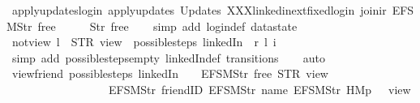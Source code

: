 \begin{isabellebody}
\ apply{\isacharunderscore}updates{\isacharunderscore}login{\isacharcolon}\ {\isachardoublequoteopen}apply{\isacharunderscore}updates\ {\isacharparenleft}Updates\ XXXlinkedin{\isacharunderscore}ext{\isacharunderscore}fixed{\isachardot}login{\isacharparenright}\ {\isacharparenleft}join{\isacharunderscore}ir\ {\isacharbrackleft}EFSM{\isachardot}Str\ {\isacharprime}{\isacharprime}free{\isacharprime}{\isacharprime}{\isacharbrackright}\ {\isacharless}{\isachargreater}{\isacharparenright}\ {\isacharless}{\isachargreater}\ {\isacharequal}\ {\isacharparenleft}{\isacharless}{\isachargreater}{\isacharparenleft}{}\ {\isacharcolon}{\isacharequal}\ Str\ {\isacharprime}{\isacharprime}free{\isacharprime}{\isacharprime}{\isacharparenright}{\isacharparenright}{\isachardoublequoteclose}\isanewline
%
\isadelimproof
\ \ %
\endisadelimproof
%
\isatagproof
{}\isamarkupfalse%
\ {\isacharparenleft}simp\ add{\isacharcolon}\ login{\isacharunderscore}def\ datastate{\isacharparenright}%
\endisatagproof
{\isafoldproof}%
%
\isadelimproof
\isanewline
%
\endisadelimproof
\isanewline
{}\isamarkupfalse%
\ not{\isacharunderscore}view{\isacharunderscore}{}{\isacharcolon}\ {\isachardoublequoteopen}l\ {\isasymnoteq}\ STR\ {\isacharprime}{\isacharprime}view{\isacharprime}{\isacharprime}\ {\isasymLongrightarrow}\ possible{\isacharunderscore}steps\ linkedIn\ {}\ r\ l\ i\ {\isacharequal}\ {\isacharbraceleft}{\isacharbar}{\isacharbar}{\isacharbraceright}{\isachardoublequoteclose}\isanewline
%
\isadelimproof
\ \ %
\endisadelimproof
%
\isatagproof
{}\isamarkupfalse%
\ {\isacharparenleft}simp\ add{\isacharcolon}\ possible{\isacharunderscore}steps{\isacharunderscore}empty\ linkedIn{\isacharunderscore}def\ transitions{\isacharparenright}\isanewline
\ \ \isamarkupfalse%
\ auto%
\endisatagproof
{\isafoldproof}%
%
\isadelimproof
\isanewline
%
\endisadelimproof
\isanewline
{}\isamarkupfalse%
\ view{\isacharunderscore}friend{\isacharcolon}\ {\isachardoublequoteopen}possible{\isacharunderscore}steps\ linkedIn\ {}\ {\isacharparenleft}{\isacharless}{\isachargreater}{\isacharparenleft}{}\ {\isacharcolon}{\isacharequal}\ EFSM{\isachardot}Str\ {\isacharprime}{\isacharprime}free{\isacharprime}{\isacharprime}{\isacharparenright}{\isacharparenright}\ STR\ {\isacharprime}{\isacharprime}view{\isacharprime}{\isacharprime}\isanewline
\ \ \ \ \ \ \ \ \ \ \ \ \ \ \ \ \ \ {\isacharbrackleft}EFSM{\isachardot}Str\ {\isacharprime}{\isacharprime}friendID{\isacharprime}{\isacharprime}{\isacharcomma}\ EFSM{\isachardot}Str\ {\isacharprime}{\isacharprime}name{\isacharprime}{\isacharprime}{\isacharcomma}\ EFSM{\isachardot}Str\ {\isacharprime}{\isacharprime}HM{}p{\isacharprime}{\isacharprime}{\isacharbrackright}\ {\isacharequal}\ {\isacharbraceleft}{\isacharbar}{\isacharparenleft}{}{\isacharcomma}\ view{\isacharparenright}{\isacharbar}{\isacharbraceright}{\isachardoublequoteclose}\isanewline

\end{isabellebody}
